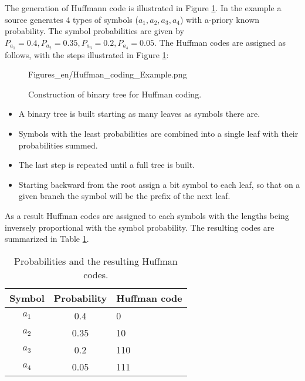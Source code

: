The generation of Huffmann code is illustrated in Figure \ref{Fig:huffman}.
In the example a source generates 4 types of symbols ($a_1, a_2, a_3, a_4$) with a-priory known probability. 
The symbol probabilities are given by $P_{a_1} = 0.4, P_{a_2} = 0.35, P_{a_3} = 0.2, P_{a_4} = 0.05$.
The Huffman codes are assigned as follows, with the steps illustrated in Figure \ref{Fig:huffman}:
\begin{figure}[h!]
	\centering
	\begin{minipage}[c]{0.5\textwidth}
	\begin{overpic}[width = 1\columnwidth ]{Figures_en/Huffman_coding_Example.png}
	\end{overpic}   \end{minipage}\hfill
		\begin{minipage}[c]{0.45\textwidth}
	\caption{Construction of binary tree for Huffman coding.}
	\label{Fig:huffman}  \end{minipage}
\end{figure}
\begin{itemize}
\item A binary tree is built starting as many leaves as symbols there are.
\item Symbols with the least probabilities are combined into a single leaf with their probabilities summed.
\item The last step is repeated until a full tree is built.
\item Starting backward from the root assign a bit symbol to each leaf, so that on a given branch the symbol will be the prefix of the next leaf.
\end{itemize}
As a result Huffman codes are assigned to each symbols with the lengths being inversely proportional with the symbol probability.
The resulting codes are summarized in Table \ref{tab:huffmann}.
\begin{table}[h!]
\caption{Probabilities and the resulting Huffman codes.}
\renewcommand*{\arraystretch}{1}
\label{tab:huffmann}
\begin{center}
    \begin{tabular}[h!]{ @{}c | | c | l @{} }%
	Symbol &   Probability & Huffman code \\ \hline
    $a_1$  &   0.4         &   0 \\
    $a_2$  &   0.35 	   &   10 \\
    $a_3$  &   0.2 		   &   110 \\
    $a_4$  &   0.05   	   &   111 
\end{tabular}
\end{center}
\end{table}

